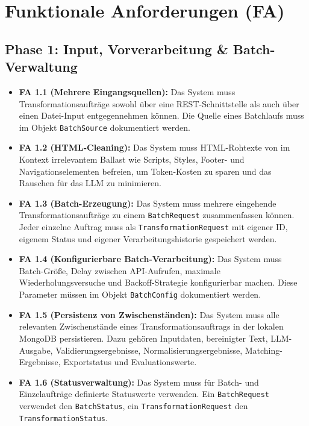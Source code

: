 \documentclass[11pt,a4paper]{article}
\begin{document}
\newpage
\section{Funktionale Anforderungen (FA)}

\subsection{Phase 1: Input, Vorverarbeitung \& Batch-Verwaltung}

\begin{itemize}[leftmargin=*]
    \item \textbf{FA 1.1 (Mehrere Eingangsquellen):} Das System muss Transformationsaufträge sowohl über eine REST-Schnittstelle als auch über einen Datei-Input entgegennehmen können. Die Quelle eines Batchlaufs muss im Objekt \texttt{BatchSource} dokumentiert werden.
    
    \item \textbf{FA 1.2 (HTML-Cleaning):} Das System muss HTML-Rohtexte von im Kontext irrelevantem Ballast wie Scripts, Styles, Footer- und Navigationselementen befreien, um Token-Kosten zu sparen und das Rauschen für das LLM zu minimieren.
    
    \item \textbf{FA 1.3 (Batch-Erzeugung):} Das System muss mehrere eingehende Transformationsaufträge zu einem \texttt{BatchRequest} zusammenfassen können. Jeder einzelne Auftrag muss als \texttt{TransformationRequest} mit eigener ID, eigenem Status und eigener Verarbeitungshistorie gespeichert werden.
    
    \item \textbf{FA 1.4 (Konfigurierbare Batch-Verarbeitung):} Das System muss Batch-Größe, Delay zwischen API-Aufrufen, maximale Wiederholungsversuche und Backoff-Strategie konfigurierbar machen. Diese Parameter müssen im Objekt \texttt{BatchConfig} dokumentiert werden.
    
    \item \textbf{FA 1.5 (Persistenz von Zwischenständen):} Das System muss alle relevanten Zwischenstände eines Transformationsauftrags in der lokalen MongoDB persistieren. Dazu gehören Inputdaten, bereinigter Text, LLM-Ausgabe, Validierungsergebnisse, Normalisierungsergebnisse, Matching-Ergebnisse, Exportstatus und Evaluationswerte.
    
    \item \textbf{FA 1.6 (Statusverwaltung):} Das System muss für Batch- und Einzelaufträge definierte Statuswerte verwenden. Ein \texttt{BatchRequest} verwendet den \texttt{BatchStatus}, ein \texttt{TransformationRequest} den \texttt{TransformationStatus}.
\end{itemize}
\end{document}
